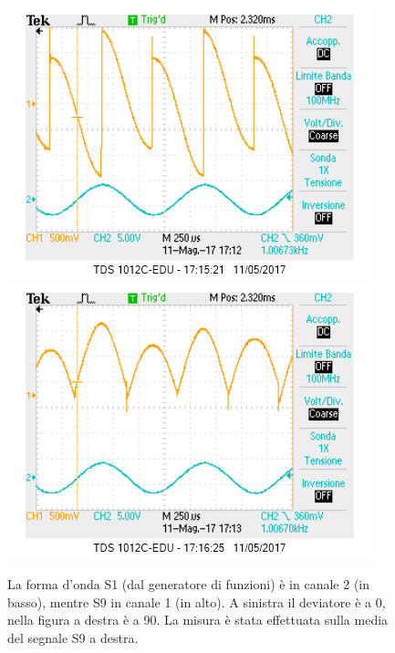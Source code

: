 \documentclass[10pt,a4paper]{article}
\begin{document}
\begin{figure}[!htb]
  \centering
  \includegraphics[scale=0.45]{dev0ch1S9-ch2S1(zero).png}\includegraphics[scale=0.45]{dev90ch1S9-ch2S1(zero).png}
\caption{La forma d'onda S1 (dal generatore di funzioni) è in canale 2 (in basso), mentre S9 in canale 1 (in alto). A sinistra il deviatore è a 0\degree, nella figura a destra è a 90\degree. La misura è stata effettuata sulla media del segnale S9 a destra. \label{osc:S9(zero)}}
\end{figure}
\end{document}
